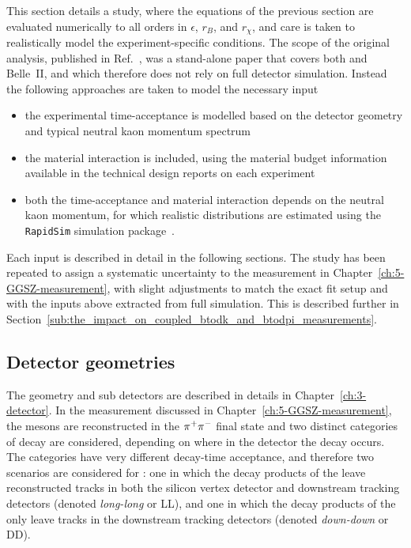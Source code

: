 This section details a study, where the equations of the previous section are evaluated numerically to all orders in $\epsilon$, $r_B$, and $r_\chi$, and care is taken to realistically model the experiment-specific conditions. The scope of the original analysis, published in Ref.~\cite{KsCPV}, was a stand-alone paper that covers both \lhcb and Belle~II, and which therefore does not rely on full detector simulation. Instead the following approaches are taken to model the necessary input
\begin{itemize}
  \item the experimental time-acceptance is modelled based on the detector geometry and typical neutral kaon momentum spectrum
  \item the material interaction is included, using the material budget information available in the technical design reports on each experiment
  \item both the time-acceptance and material interaction depends on the neutral kaon momentum, for which realistic distributions are estimated using the \texttt{RapidSim} simulation package~\cite{cowanRapidSimApplicationFast2017}.
\end{itemize}
Each input is described in detail in the following sections. The study has been repeated to assign a systematic uncertainty to the \lhcb measurement in Chapter~\ref{ch:5-GGSZ-measurement}, with slight adjustments to match the exact fit setup and with the inputs above extracted from full \lhcb simulation. This is described further in Section~\ref{sub:the_impact_on_coupled_btodk_and_btodpi_measurements}.

\subsection{Detector geometries} %
\label{sub:detector_geometries}

The \lhcb geometry and sub detectors are described in details in Chapter~\ref{ch:3-detector}. In the \lhcb measurement discussed in Chapter~\ref{ch:5-GGSZ-measurement}, the \KS mesons are reconstructed in the ${{\pi}^+}{{\pi}^-}$ final state and two distinct categories of decay are considered, depending on where in the detector the \KS decay occurs. The categories have very different decay-time acceptance, and therefore  two scenarios are considered for \lhcb:  one in which the decay products of the \KS leave reconstructed tracks in both the silicon vertex detector and downstream tracking detectors (denoted \emph{long-long} or LL), and one in which the decay products of the \KS only leave tracks in the downstream tracking detectors (denoted \emph{down-down} or DD). 

